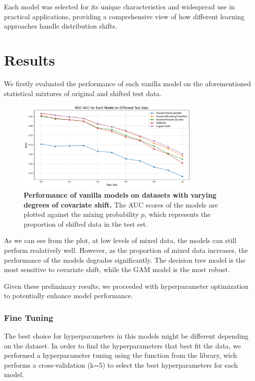Each model was selected for its unique characteristics and widespread use in practical applications, providing a comprehensive view of how different learning approaches handle distribution shifts.

\section{Results}

We firstly evaluated the performance of each vanilla model on the aforementioned statistical mixtures of original and shifted test data. 

\begin{figure}[H]
    \centering
    \includegraphics[width=0.8\textwidth]{assets/vanilla.png} 
    \caption{\textbf{Performance of vanilla models on datasets with varying degrees of covariate shift.} The AUC scores of the models are plotted against the mixing probability $p$, which represents the proportion of shifted data in the test set.}
    \label{fig:vanilla-models-perf}
\end{figure}

As we can see from the plot, at low levels of mixed data, the models can still perform realatively well. However, as the proportion of mixed data increases, the performance of the models degrades significantly. The decision tree model is the most sensitive to covariate shift, while the GAM model is the most robust.

Given these preliminary results, we proceeded with hyperparameter optimization to potentially enhance model performance.

\subsubsection{Fine Tuning}

The best choice for hyperparameters in this models might be different depending on the dataset. In order to find the hyperparameters that best fit the data, we performed a hyperparameter tuning using the  function from the  library, wich performs a cross-validation (k=5) to select the best hyperparameters for each model.

